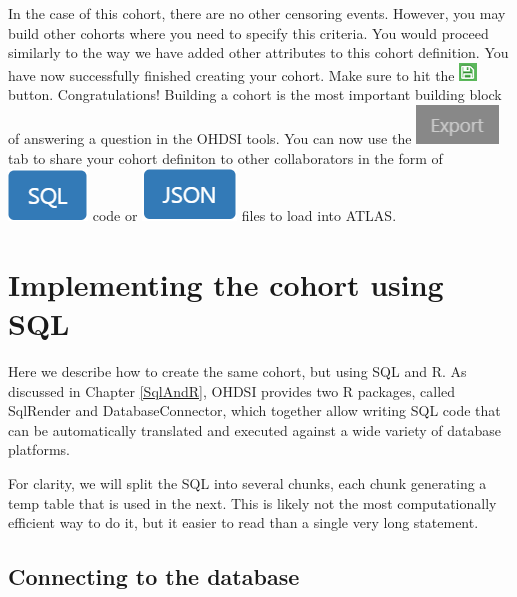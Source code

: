 \documentclass[11pt]{book}
\theoremstyle{definition}
\theoremstyle{definition}
\theoremstyle{definition}
\theoremstyle{remark}
\begin{document}
In the case of this cohort, there are no other censoring events. However, you may build other cohorts where you need to specify this criteria. You would proceed similarly to the way we have added other attributes to this cohort definition. You have now successfully finished creating your cohort. Make sure to hit the \includegraphics{images/Cohorts/save.png} button. Congratulations! Building a cohort is the most important building block of answering a question in the OHDSI tools. You can now use the \includegraphics{images/Cohorts/export.png} tab to share your cohort definiton to other collaborators in the form of \includegraphics{images/Cohorts/SQL.png} code or \includegraphics{images/Cohorts/json.png} files to load into ATLAS.

\hypertarget{implementing-the-cohort-using-sql}{%
\section{Implementing the cohort using SQL}\label{implementing-the-cohort-using-sql}}

Here we describe how to create the same cohort, but using SQL and R. As discussed in Chapter \ref{SqlAndR}, OHDSI provides two R packages, called SqlRender and DatabaseConnector, which together allow writing SQL code that can be automatically translated and executed against a wide variety of database platforms.

For clarity, we will split the SQL into several chunks, each chunk generating a temp table that is used in the next. This is likely not the most computationally efficient way to do it, but it easier to read than a single very long statement.

\hypertarget{connecting-to-the-database}{%
\subsection{Connecting to the database}\label{connecting-to-the-database}}
\end{document}
